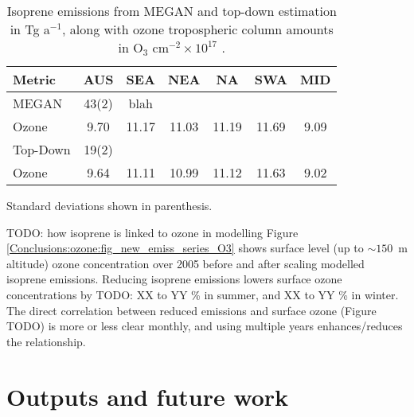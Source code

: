   \begin{table}\begin{threeparttable}
    \caption{Isoprene emissions from MEGAN and top-down estimation in Tg a$^{-1}$, along with ozone tropospheric column amounts in O$_3$ cm$^{-2} \times 10^{17}$ .}
    \begin{tabular}{ l c c c c c c } 
      \toprule
      Metric & AUS & SEA & NEA & NA & SWA & MID \\
      \midrule
      MEGAN & 43(2) & blah &  &  & & \\
      Ozone & 9.70 & 11.17 & 11.03 & 11.19 & 11.69 & 9.09 \\
      \midrule
      Top-Down & 19(2) & & & & & \\
      Ozone & 9.64 & 11.11 & 10.99 & 11.12 & 11.63 & 9.02 \\
      \bottomrule
    \end{tabular}
    \begin{tablenotes}
      \item Standard deviations shown in parenthesis.
    \end{tablenotes}
    \label{Conclusions:ozone:tab_emissions_vs_ozone}
  \end{threeparttable}\end{table}

  
  TODO: how isoprene is linked to ozone in modelling 
  Figure \ref{Conclusions:ozone:fig_new_emiss_series_O3} shows surface level (up to $\sim 150$~m altitude) ozone concentration over 2005 before and after scaling modelled isoprene emissions.
  Reducing isoprene emissions lowers surface ozone concentrations by TODO: XX to YY \% in summer, and XX to YY \% in winter.
  The direct correlation between reduced emissions and surface ozone (Figure TODO) is more or less clear monthly, and using multiple years enhances/reduces the relationship.
  

  
\section{Outputs and future work}
\label{Conclusions:future}
  
